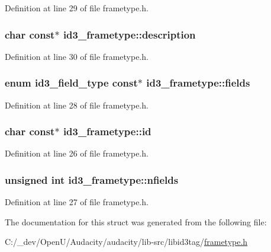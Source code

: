 Definition at line 29 of file frametype.\+h.

\subsubsection[{\texorpdfstring{description}{description}}]{\setlength{\rightskip}{0pt plus 5cm}char {\bf const}$\ast$ id3\+\_\+frametype\+::description}\hypertarget{structid3__frametype_ad70edb7fbf92202a1828180a46925b6d}{}\label{structid3__frametype_ad70edb7fbf92202a1828180a46925b6d}


Definition at line 30 of file frametype.\+h.

\subsubsection[{\texorpdfstring{fields}{fields}}]{\setlength{\rightskip}{0pt plus 5cm}enum {\bf id3\+\_\+field\+\_\+type} {\bf const}$\ast$ id3\+\_\+frametype\+::fields}\hypertarget{structid3__frametype_a6723658ff5b0c5dcc9cef389cba93cb3}{}\label{structid3__frametype_a6723658ff5b0c5dcc9cef389cba93cb3}


Definition at line 28 of file frametype.\+h.

\subsubsection[{\texorpdfstring{id}{id}}]{\setlength{\rightskip}{0pt plus 5cm}char {\bf const}$\ast$ id3\+\_\+frametype\+::id}\hypertarget{structid3__frametype_aaa7c1eff1a15e6a9649fc41062fd904b}{}\label{structid3__frametype_aaa7c1eff1a15e6a9649fc41062fd904b}


Definition at line 26 of file frametype.\+h.

\subsubsection[{\texorpdfstring{nfields}{nfields}}]{\setlength{\rightskip}{0pt plus 5cm}unsigned {\bf int} id3\+\_\+frametype\+::nfields}\hypertarget{structid3__frametype_ac8b2f6783047249f4f3feaf937ad7903}{}\label{structid3__frametype_ac8b2f6783047249f4f3feaf937ad7903}


Definition at line 27 of file frametype.\+h.



The documentation for this struct was generated from the following file\+:\begin{DoxyCompactItemize}
\item 
C\+:/\+\_\+dev/\+Open\+U/\+Audacity/audacity/lib-\/src/libid3tag/\hyperlink{frametype_8h}{frametype.\+h}\end{DoxyCompactItemize}
